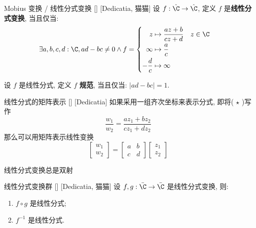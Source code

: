 \documentclass[UTF8]{ctexart}
\begin{document}
        \begin{dfn}
            [UUID]
            {Mobius 变换 / 线性分式变换}
            []
            [Dedicatia, 猫猫]
            设 \(f:\hat{\C}\to\hat{\C}\), 定义 \(f\) 是\textbf{线性分式变换}, 当且仅当: 
            \[\exists a,b,c,d:\C, ad-bc\neq 0\land f=
            \begin{cases}
            \begin{aligned}
                z & \mapsto\frac{az+b}{cz+d} & z\in\C\\
                \infty & \mapsto\frac{a}{c}\\
                -\frac{d}{c} & \mapsto\infty
            \end{aligned}
            \end{cases}\]

            设 \(f\) 是线性分式, 定义 \(f\) \textbf{规范}, 当且仅当: \(|ad-bc|=1\). 
        \end{dfn}

        \begin{ppt}
            [UUID]
            {线性分式的矩阵表示}
            []
            [Dedicatia]
            如果采用一组齐次坐标来表示分式, 即将( \(\star\) )写作
            \[\frac{w_1}{w_2}=\frac{az_1+bz_2}{cz_1+dz_2}\]
            那么可以用矩阵表示线性变换
            \[
            \begin{bmatrix}
                w_1 \\ w_2
            \end{bmatrix}
            =
            \begin{bmatrix}
                a & b \\ c & d
            \end{bmatrix}
            \begin{bmatrix}
                z_1 \\ z_2
            \end{bmatrix}
            \]
        \end{ppt}
        
        \begin{ppt}
            {线性分式变换总是双射}
        \end{ppt}
        
        \begin{ppt}
            []
            {线性分式变换群}
            []
            [Dedicatia, 猫猫]
            设 \(f, g:\bar{\C}\to\bar{\C}\) 是线性分式变换, 则: 
            \begin{enumerate}
                \item \(f\circ g\) 是线性分式; 
                \item \(f^{-1}\) 是线性分式. 
            \end{enumerate}
        \end{ppt}
\end{document}
